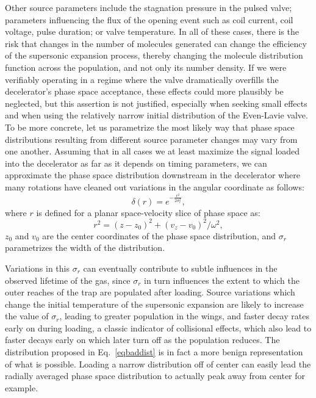 Other source parameters include the stagnation pressure in the pulsed valve; parameters influencing the flux of the opening event such as coil current, coil voltage, pulse duration; or valve temperature.
In all of these cases, there is the risk that changes in the number of molecules generated can change the efficiency of the supersonic expansion process, thereby changing the molecule distribution function across the population, and not only its number density.
If we were verifiably operating in a regime where the valve dramatically overfills the decelerator's phase space acceptance, these effects could more plausibly be neglected, but this assertion is not justified, especially when seeking small effects and when using the relatively narrow initial distribution of the Even-Lavie valve.
To be more concrete, let us parametrize the most likely way that phase space distributions resulting from different source parameter changes may vary from one another.
Assuming that in all cases we at least maximize the signal loaded into the decelerator as far as it depends on timing parameters, we can approximate the phase space distribution downstream in the decelerator where many rotations have cleaned out variations in the angular coordinate as follows:
\begin{equation}
\delta(r) = e^{-\frac{r^2}{2\sigma_r^2}},\label{eqbaddist}
\end{equation}
where $r$ is defined for a planar space-velocity slice of phase space as:
\begin{equation}
r^2 = (z-z_0)^2 + (v_z-v_0)^2/\omega^2,
\end{equation}
$z_0$ and $v_0$ are the center coordinates of the phase space distribution, and $\sigma_r$ parametrizes the width of the distribution.

Variations in this $\sigma_r$ can eventually contribute to subtle influences in the observed lifetime of the gas, since $\sigma_r$ in turn influences the extent to which the outer reaches of the trap are populated after loading.
Source variations which change the initial temperature of the supersonic expansion are likely to increase the value of $\sigma_r$, leading to greater population in the wings, and faster decay rates early on during loading, a classic indicator of collisional effects, which also lead to faster decays early on which later turn off as the population reduces.
The distribution proposed in Eq.~\ref{eqbaddist} is in fact a more benign representation of what is possible.
Loading a narrow distribution off of center can easily lead the radially averaged phase space distribution to actually peak away from center for example.

